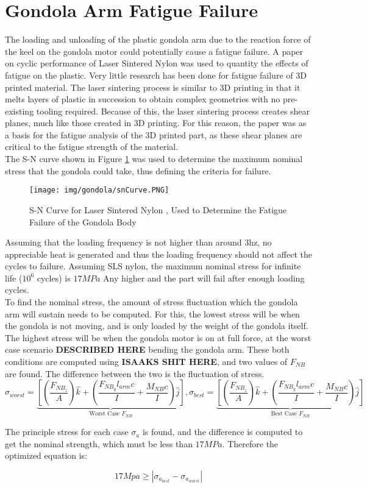 \documentclass[../main.tex]{subfiles}
\begin{document}
\section{Gondola Arm Fatigue Failure}
The loading and unloading of the plastic gondola arm due to the reaction force of the keel on the gondola motor could potentially cause a fatigue failure. A paper on cyclic performance of Laser Sintered Nylon \cite{fatiguePlastic} was used to quantity the effects of fatigue on the plastic. Very little research has been done for fatigue failure of 3D printed material. The laser sintering process is similar to 3D printing in that it melts layers of plastic in succession to obtain complex geometries with no pre-existing tooling required. Because of this, the laser sintering process creates shear planes, much like those created in 3D printing. For this reason, the paper was as a basis for the fatigue analysis of the 3D printed part, as these shear planes are critical to the fatigue strength of the material. \\

The S-N curve shown in Figure \ref{fig:snCurve} was used to determine the maximum nominal stress that the gondola could take, thus defining the criteria for failure.

\begin{figure}[H]
	\centering
	\texttt{[image: img/gondola/snCurve.PNG]}
	\caption{S-N Curve for Laser Sintered Nylon \cite{fatiguePlastic}, Used to Determine the Fatigue Failure of the Gondola Body}
	\label{fig:snCurve}
\end{figure}

Assuming that the loading frequency is not higher than around 3hz, no appreciable heat is generated and thus the loading frequency should not affect the cycles to failure. Assuming SLS nylon, the maximum nominal stress for infinite life ($10^6$ cycles) is $17MPa$ Any higher and the part will fail after enough loading cycles.\\

To find the nominal stress, the amount of stress fluctuation which the gondola arm will sustain needs to be computed. For this, the lowest stress will be when the gondola is not moving, and is only loaded by the weight of the gondola itself. The highest stress will be when the gondola motor is on at full force, at the worst case scenario \textbf{DESCRIBED HERE} bending the gondola arm. These both conditions are computed using \textbf{ISAAKS SHIT HERE}, and two values of $F_{NB}$ are found. The difference between the two is the fluctuation of stress.
\begin{equation}
	\sigma_{worst}= \underbrace{\left[\left(\dfrac{F_{NB_{z}}}{A}\right)\hat{k} + \left(\dfrac{F_{NB_{y}}l_{arm}c}{I}  + \dfrac{M_{NB}c}{I} \right) \hat{j}\right]}_\text{Worst Case $F_{NB}$}, \sigma_{best} = \underbrace{\left[\left(\dfrac{F_{NB_{z}}}{A}\right)\hat{k} + \left(\dfrac{F_{NB_{y}}l_{arm}c}{I}  + \dfrac{M_{NB}c}{I} \right) \hat{j}\right]}_\text{Best Case $F_{NB}$}
\end{equation}

The principle stress for each case $\sigma _a$ is found, and the difference is computed to get the nominal strength, which must be less than $17MPa$. Therefore the optimized equation is:

\begin{equation}
	17Mpa \geq \left|\sigma _{a_{best}}-\sigma _{a_{worst}}\right|
\end{equation} 
\end{document}
